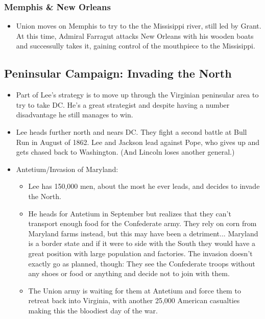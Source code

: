 \documentclass{article}
\begin{document}
    \subsubsection{Memphis \& New Orleans}
      \begin{itemize}
        \item Union moves on Memphis to try to the the Missisippi river, still led by Grant. At this time, Admiral Farragut attacks New Orleans with his wooden boats and successully takes it, gaining control of the mouthpiece to the Missisippi.
      \end{itemize}
  \subsection{Peninsular Campaign: Invading the North}
    \begin{itemize}
      \item Part of Lee's strategy is to move up through the Virginian peninsular area to try to take DC. He's a great strategist and despite having a number disadvantage he still manages to win.
      \item Lee heads further north and nears DC. They fight a second battle at Bull Run in August of 1862. Lee and Jackson lead against Pope, who gives up and gets chased back to Washington. (And Lincoln loses another general.)
      \item Antetium/Invasion of Maryland:
        \begin{itemize}
          \item Lee has 150,000 men, about the most he ever leads, and decides to invade the North.
          \item He heads for Antetium in September but realizes that they can't transport enough food for the Confederate army. They rely on corn from Maryland farms instead, but this may have been a detriment... Maryland is a border state and if it were to side with the South they would have a great position with large population and factories. The invasion doesn't exactly go as planned, though: They see the Confederate troops without any shoes or food or anything and decide not to join with them.
          \item The Union army is waiting for them at Antetium and force them to retreat back into Virginia, with another 25,000 American casualties making this the bloodiest day of the war.
        \end{itemize}
    \end{itemize}
\end{document}
